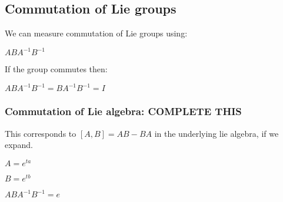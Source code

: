 
\subsection{Commutation of Lie groups}

We can measure commutation of Lie groups using:

\(ABA^{-1}B^{-1}\)

If the group commutes then:

\(ABA^{-1}B^{-1}=BA^{-1}B^{-1}=I\)

\subsubsection{Commutation of Lie algebra: COMPLETE THIS}

This corresponds to \([A,B]=AB-BA\) in the underlying lie algebra, if we expand.

\(A=e^{ta}\)

\(B=e^{tb}\)

\(ABA^{-1}B^{-1}=e\)

